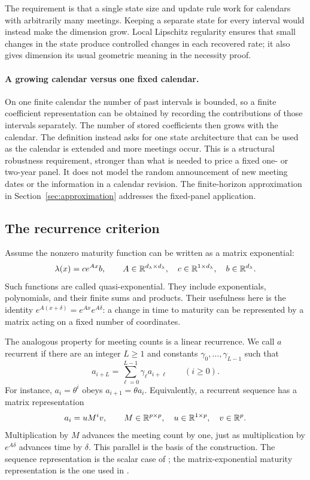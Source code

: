 The requirement is that a single state size and update rule work for calendars with arbitrarily many meetings. Keeping a separate state for every interval would instead make the dimension grow. Local Lipschitz regularity ensures that small changes in the state produce controlled changes in each recovered rate; it also gives dimension its usual geometric meaning in the necessity proof.

\paragraph{A growing calendar versus one fixed calendar.}
On one finite calendar the number of past intervals is bounded, so a finite coefficient representation can be obtained by recording the contributions of those intervals separately. The number of stored coefficients then grows with the calendar. The definition instead asks for one state architecture that can be used as the calendar is extended and more meetings occur. This is a structural robustness requirement, stronger than what is needed to price a fixed one- or two-year panel. It does not model the random announcement of new meeting dates or the information in a calendar revision. The finite-horizon approximation in Section~\ref{sec:approximation} addresses the fixed-panel application.

\subsection{The recurrence criterion}
Assume the nonzero maturity function can be written as a matrix exponential:
\begin{equation}
\lambda(x)=c e^{Ax}b,\qquad A\in\mathbb R^{d_\lambda\times d_\lambda},\quad c\in\mathbb R^{1\times d_\lambda},\quad b\in\mathbb R^{d_\lambda}.\label{eq:shape}
\end{equation}
Such functions are called quasi-exponential. They include exponentials, polynomials, and their finite sums and products. Their usefulness here is the identity $e^{A(x+\delta)}=e^{Ax}e^{A\delta}$: a change in time to maturity can be represented by a matrix acting on a fixed number of coordinates.

The analogous property for meeting counts is a linear recurrence. We call $a$ recurrent if there are an integer $L\ge1$ and constants $\gamma_0,\ldots,\gamma_{L-1}$ such that
\[
a_{i+L}=\sum_{\ell=0}^{L-1}\gamma_\ell a_{i+\ell}\qquad(i\ge0).
\]
For instance, $a_i=\theta^i$ obeys $a_{i+1}=\theta a_i$. Equivalently, a recurrent sequence has a matrix representation
\begin{equation}
a_i=uM^iv,\qquad M\in\mathbb R^{p\times p},\quad u\in\mathbb R^{1\times p},\quad v\in\mathbb R^p.\label{eq:recurrence}
\end{equation}
Multiplication by $M$ advances the meeting count by one, just as multiplication by $e^{A\delta}$ advances time by $\delta$. This parallel is the basis of the construction. The sequence representation is the scalar case of \citet[Proposition 1]{hokalman1966effective}; the matrix-exponential maturity representation is the one used in \citet[Proposition 3.1]{bjork1999minimal}.

